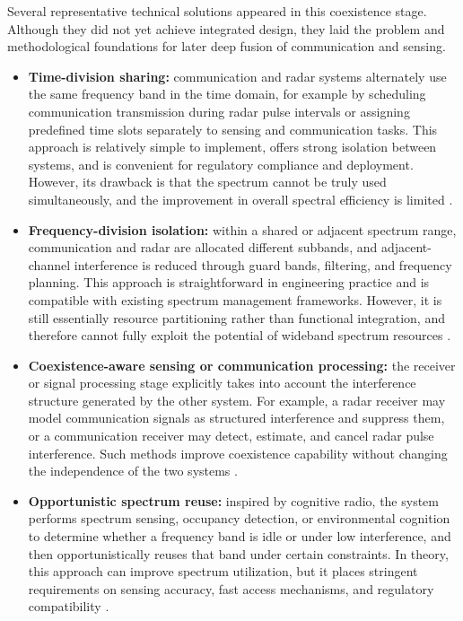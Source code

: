Several representative technical solutions appeared in this coexistence stage. Although they did not yet achieve integrated design, they laid the problem and methodological foundations for later deep fusion of communication and sensing.
\begin{itemize}
    \item \textbf{Time-division sharing:} communication and radar systems alternately use the same frequency band in the time domain, for example by scheduling communication transmission during radar pulse intervals or assigning predefined time slots separately to sensing and communication tasks. This approach is relatively simple to implement, offers strong isolation between systems, and is convenient for regulatory compliance and deployment. However, its drawback is that the spectrum cannot be truly used simultaneously, and the improvement in overall spectral efficiency is limited \cite{Chiriyath2017RadarCommCoexistence}.
    
    \item \textbf{Frequency-division isolation:} within a shared or adjacent spectrum range, communication and radar are allocated different subbands, and adjacent-channel interference is reduced through guard bands, filtering, and frequency planning. This approach is straightforward in engineering practice and is compatible with existing spectrum management frameworks. However, it is still essentially resource partitioning rather than functional integration, and therefore cannot fully exploit the potential of wideband spectrum resources \cite{ITU_R_RR2024}.
    
    \item \textbf{Coexistence-aware sensing or communication processing:} the receiver or signal processing stage explicitly takes into account the interference structure generated by the other system. For example, a radar receiver may model communication signals as structured interference and suppress them, or a communication receiver may detect, estimate, and cancel radar pulse interference. Such methods improve coexistence capability without changing the independence of the two systems \cite{Chiriyath2017RadarCommCoexistence,Liu2020JointRadarComm}.
    
    \item \textbf{Opportunistic spectrum reuse:} inspired by cognitive radio, the system performs spectrum sensing, occupancy detection, or environmental cognition to determine whether a frequency band is idle or under low interference, and then opportunistically reuses that band under certain constraints. In theory, this approach can improve spectrum utilization, but it places stringent requirements on sensing accuracy, fast access mechanisms, and regulatory compatibility \cite{Chiriyath2017RadarCommCoexistence,Haykin2005CognitiveRadio}.
\end{itemize}

